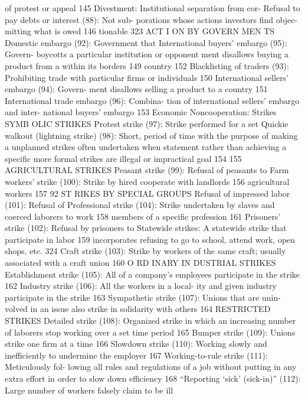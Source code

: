 \documentclass[twoside,a4paper,12pt,fleqn,openany]{extbook}
\begin{document}
of protest or appeal
 145
Divestment: Institutional separation from cor-
Refusal to pay debts or interest (88): Not sub-
 porations whose actions investors find objec-
mitting what is owed
 146
 tionable
 323
ACT I ON BY GOVERN MEN TS
Domestic embargo (92): Government that
 International buyers’ embargo (95): Govern-
boycotts a particular institution or opponent
 ment disallows buying a product from a
within its borders
 149
 country
 152
Blacklisting of traders (93): Prohibiting trade
with particular firms or individuals
 150
International sellers’ embargo (94): Govern-
ment disallows selling a product to a country		
151
International trade embargo (96): Combina-
tion of international sellers’ embargo and inter-
national buyers’ embargo
 153
Economic Noncooperation: Strikes
SYMB OLIC STRIKES
Protest strike (97): Strike performed for a set
 Quickie walkout (lightning strike) (98): Short,
period of time with the purpose of making a
 unplanned strikes often undertaken when
statement rather than achieving a specific
 more formal strikes are illegal or impractical		
goal
 154
 155
AGRICULTURAL STRIKES
Peasant strike (99): Refusal of peasants to
 Farm workers’ strike (100): Strike by hired
cooperate with landlords
 156
 agricultural workers
 157
92
ST RIKES BY SPECIAL GROUPS
Refusal of impressed labor (101): Refusal of
 Professional strike (104): Strike undertaken by
slaves and coerced laborers to work
 158
 members of a specific profession
 161
Prisoners’ strike (102): Refusal by prisoners to
 Statewide strikes: A statewide strike that
participate in labor
 159
 incorporates refusing to go to school, attend
work, open shops, etc.
 324
Craft strike (103): Strike by workers of the
same craft; usually associated with a craft
union
 160
O RD INARY IN DUSTRIAL STRIKES
Establishment strike (105): All of a company’s
employees participate in the strike
 162
Industry strike (106): All the workers in a local-
ity and given industry participate in the strike		
163
Sympathetic strike (107): Unions that are unin-
volved in an issue also strike in solidarity with
others
 164
RESTRICTED STRIKES
Detailed strike (108): Organized strike in which
an increasing number of laborers stop working
over a set time period
 165
Bumper strike (109): Unions strike one firm at
a time
 166
Slowdown strike (110): Working slowly and
inefficiently to undermine the employer 167
Working-to-rule strike (111): Meticulously fol-
lowing all rules and regulations of a job without
putting in any extra effort in order to slow down
efficiency
 168
“Reporting ‘sick’ (sick-in)” (112): Large number
of workers falsely claim to be ill
\end{document}
